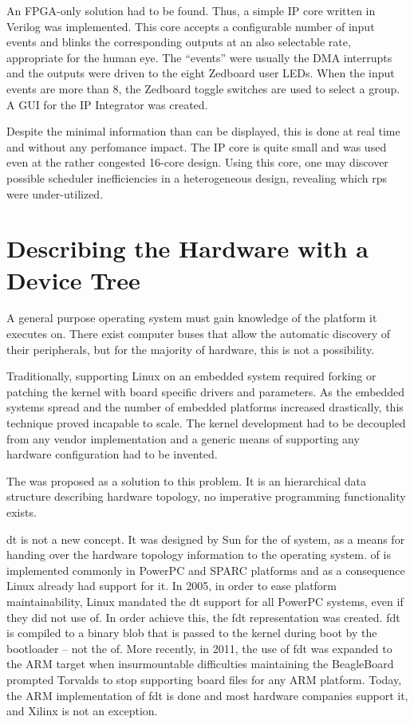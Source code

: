 An FPGA-only solution had to be found. Thus, a simple IP core written in Verilog was implemented.
This core accepts a configurable number of input events and blinks the corresponding outputs
at an also selectable rate, appropriate for the human eye. The ``events'' were usually the
DMA interrupts and the outputs were driven to the eight Zedboard user LEDs. When the input events
are more than 8, the Zedboard toggle switches are used to select a group.
A GUI for the IP Integrator was created.

Despite the minimal information than can be displayed, this is done at real time and without
any perfomance impact. The IP core is quite small and was used even at the rather congested 16-core design.
Using this core, one may discover possible scheduler inefficiencies in a heterogeneous design,
revealing which \glspl{rp} were under-utilized.

\section{Describing the Hardware with a Device Tree}

A general purpose operating system must gain knowledge of the platform it executes on.
There exist computer buses that allow the automatic discovery of their peripherals,
but for the majority of hardware, this is not a possibility.

Traditionally, supporting Linux on an embedded system required forking or patching the kernel
with board specific drivers and parameters. As the embedded systems spread and the number
of embedded platforms increased drastically, this technique proved incapable to scale.
The kernel development had to be decoupled from any vendor implementation
and a generic means of supporting any hardware configuration had to be invented.

The  was proposed as a solution to this problem.
It is an hierarchical data structure describing hardware topology,
no imperative programming functionality exists.

\Gls{dt} is not a new concept. It was designed by Sun for the \gls{of} system,
as a means for handing over the hardware topology information to the operating system.
\Gls{of} is implemented commonly in PowerPC and SPARC platforms and as a consequence
Linux already had support for it.
In 2005, in order to ease platform maintainability,
Linux mandated the \gls{dt} support for all PowerPC systems,
even if they did not use \gls{of}. In order achieve this, the \gls{fdt} representation
was created. \Gls{fdt} is compiled to a binary blob that is passed
to the kernel during boot by the bootloader -- not the \gls{of}. More recently, in 2011,
the use of \gls{fdt} was expanded to the ARM target when insurmountable difficulties maintaining
the BeagleBoard prompted Torvalds to stop supporting board files for any ARM platform.
Today, the ARM implementation of \gls{fdt} is done and most hardware companies
support it, and Xilinx is not an exception.


